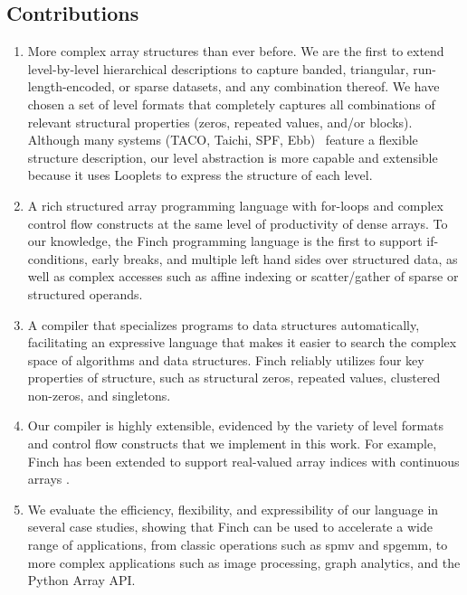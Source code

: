 \subsection{Contributions}


\begin{enumerate}
\item More complex array structures than ever before. We are the first to extend level-by-level hierarchical descriptions to capture banded, triangular, run-length-encoded, or sparse datasets, and any combination thereof.
%
We have chosen a set of level formats that completely captures all combinations of relevant structural properties (zeros, repeated values, and/or blocks).
%
Although many systems (TACO, Taichi, SPF, Ebb)~\cite{chou2018format,  hu_taichi_2019, strout2018sparse, bernstein2016ebb} feature a flexible structure description, our level abstraction is more capable and extensible because it uses Looplets \cite{ahrens_looplets_2023} to express the structure of each level. 
%
\item A rich structured array programming language with for-loops and complex control flow constructs at the same level of productivity of dense arrays. 
%
To our knowledge, the Finch programming language is the first to support if-conditions, early breaks, and multiple left hand sides over structured data, as well as complex accesses such as affine indexing or scatter/gather of sparse or structured operands.
%
\item A compiler that specializes programs to data structures automatically, facilitating an expressive language that makes it easier to search the complex space of algorithms and data structures. Finch reliably utilizes four key properties of structure, such as structural zeros, repeated values, clustered non-zeros, and singletons.
%
\item Our compiler is highly extensible, evidenced by the variety of level formats and control flow constructs that we implement in this work.
%
For example, Finch has been extended to support real-valued array indices with continuous arrays \cite{won2024continuous}.
%
\item We evaluate the efficiency, flexibility, and expressibility of our language in several case studies, showing that Finch can be used to accelerate a wide range of applications,  from classic operations such as spmv and spgemm, to more complex applications such as image processing, graph analytics, and the Python Array API. 

\end{enumerate}
